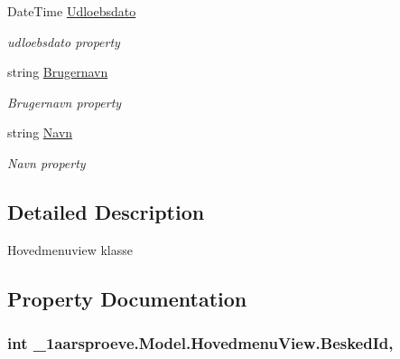 \begin{DoxyCompactItemize}
Date\+Time \hyperlink{class__1aarsproeve_1_1_model_1_1_hovedmenu_view_af10dad34551f6ab6cbc31d012006bfab}{Udloebsdato}
\begin{DoxyCompactList}\small\item\em udloebsdato property \end{DoxyCompactList}\item 
string \hyperlink{class__1aarsproeve_1_1_model_1_1_hovedmenu_view_a19d8f85e7c06c7535a38259c9c765082}{Brugernavn}
\begin{DoxyCompactList}\small\item\em Brugernavn property \end{DoxyCompactList}\item 
string \hyperlink{class__1aarsproeve_1_1_model_1_1_hovedmenu_view_ad5ddaea59224b5244b2c83113b94d27e}{Navn}
\begin{DoxyCompactList}\small\item\em Navn property \end{DoxyCompactList}\end{DoxyCompactItemize}


\subsection{Detailed Description}
Hovedmenuview klasse 



\subsection{Property Documentation}
\hypertarget{class__1aarsproeve_1_1_model_1_1_hovedmenu_view_a35a1657a9b532a70e83a6c6c68a1a813}{}
\subsubsection[{Besked\+Id}]{\setlength{\rightskip}{0pt plus 5cm}int \+\_\+1aarsproeve.\+Model.\+Hovedmenu\+View.\+Besked\+Id\hspace{0.3cm}{\ttfamily [get]}, {\ttfamily [set]}}\label{class__1aarsproeve_1_1_model_1_1_hovedmenu_view_a35a1657a9b532a70e83a6c6c68a1a813}


